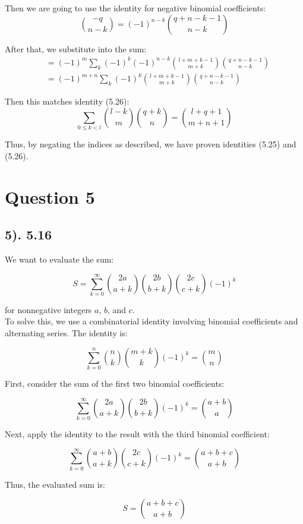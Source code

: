 \documentclass[12pt]{article}
\begin{document}
Then we are going to use the identity for negative binomial coefficients:
\begin{equation}
    \binom{-q}{n-k} = {(-1)}^{n-k} \binom{q+n-k-1}{n-k}
\end{equation}

After that, we substitute into the sum:
\begin{align*}
    &= {(-1)}^m \sum_{k} {(-1)}^k {(-1)}^{n-k} \binom{l+m+k-1}{m+k} \binom{q+n-k-1}{n-k} \\
    &= {(-1)}^{m+n} \sum_{k} {(-1)}^k \binom{l+m+k-1}{m+k} \binom{q+n-k-1}{n-k}
\end{align*}

Then this matches identity (5.26):
\begin{equation}
    \sum_{0 \le k < l} \binom{l-k}{m} \binom{q+k}{n} = \binom{l+q+1}{m+n+1}
\end{equation}

Thus, by negating the indices as described, we have proven identities (5.25) and (5.26).

\section*{Question 5}
\subsection*{5). 5.16}
We want to evaluate the sum:

\[
S = \sum_{k=0}^{\infty} \binom{2a}{a+k} \binom{2b}{b+k} \binom{2c}{c+k} (-1)^k
\]

for nonnegative integers \(a\), \(b\), and \(c\). \\

To solve this, we use a combinatorial identity involving binomial coefficients and alternating series. The identity is:

\[
\sum_{k=0}^{n} \binom{n}{k} \binom{m+k}{k} (-1)^k = \binom{m}{n}
\]

First, consider the sum of the first two binomial coefficients:

\[
\sum_{k=0}^{\infty} \binom{2a}{a+k} \binom{2b}{b+k} (-1)^k = \binom{a+b}{a}
\]

Next, apply the identity to the result with the third binomial coefficient:

\[
\sum_{k=0}^{\infty} \binom{a+b}{a+k} \binom{2c}{c+k} (-1)^k = \binom{a+b+c}{a+b}
\]

Thus, the evaluated sum is:

\[
S = \binom{a+b+c}{a+b}
\]
\end{document}
